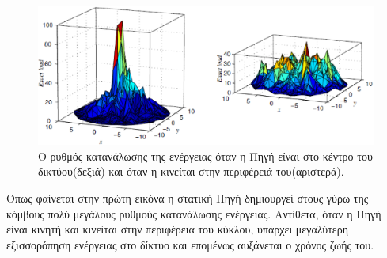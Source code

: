 \begin{figure}[h]
	\centering
	\includegraphics[width=\textwidth]{images/jointmobility_dissipation.eps}
	\caption{Ο ρυθμός κατανάλωσης της ενέργειας όταν η Πηγή είναι στο κέντρο του δικτύου(δεξιά) και όταν η κινείται στην περιφέρειά του(αριστερά).}
	\label{fig:jointmobility_dissipation}
\end{figure}

Όπως φαίνεται στην πρώτη εικόνα η στατική Πηγή δημιουργεί στους γύρω της κόμβους πολύ μεγάλους ρυθμούς κατανάλωσης ενέργειας. Αντίθετα, όταν η Πηγή είναι κινητή και
κινείται στην περιφέρεια του κύκλου, υπάρχει μεγαλύτερη εξισσορόπηση ενέργειας στο δίκτυο και επομένως αυξάνεται ο χρόνος ζωής του.

